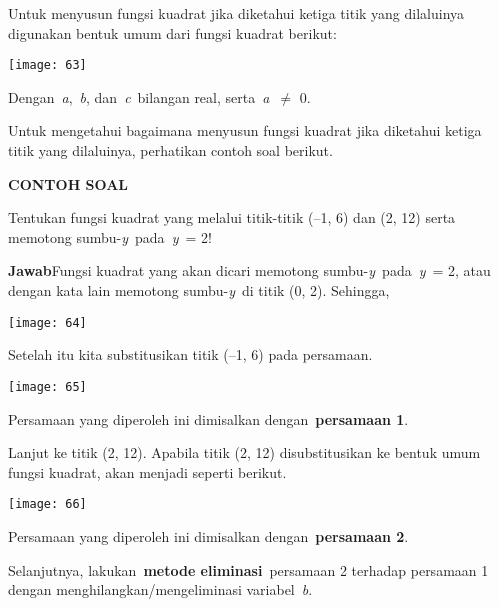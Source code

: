 \documentclass[11pt,fleqn]{book} %
\begin{document}
\noindent Untuk menyusun fungsi kuadrat jika diketahui ketiga titik yang dilaluinya digunakan bentuk umum dari fungsi kuadrat berikut:

\begin{center}
\noindent \texttt{[image: 63]}
\end{center}

\noindent Dengan~\textit{a},~\textit{b}, dan~\textit{c}~bilangan real, serta~\textit{a}~$\mathrm{\neq}$ 0.

\noindent Untuk mengetahui bagaimana menyusun fungsi kuadrat jika diketahui ketiga titik yang dilaluinya, perhatikan contoh soal berikut.

\noindent \textbf{CONTOH SOAL}

\noindent Tentukan fungsi kuadrat yang melalui titik-titik (--1, 6) dan (2, 12) serta memotong sumbu-\textit{y}~pada~\textit{y}~= 2!

\noindent \textbf{Jawab}Fungsi kuadrat yang akan dicari memotong sumbu-\textit{y}~pada~\textit{y}~= 2, atau dengan kata lain memotong sumbu-\textit{y}~di titik (0, 2). Sehingga,

\begin{center}
\noindent \texttt{[image: 64]}
\end{center}

\noindent Setelah itu kita substitusikan titik (--1, 6) pada persamaan.

\begin{center}
\noindent \texttt{[image: 65]}
\end{center}

\noindent Persamaan yang diperoleh ini dimisalkan dengan~\textbf{persamaan 1}.

\noindent Lanjut ke titik (2, 12). Apabila titik (2, 12) disubstitusikan ke bentuk umum fungsi kuadrat, akan menjadi seperti berikut.

\begin{center}
\noindent \texttt{[image: 66]}
\end{center}

\noindent Persamaan yang diperoleh ini dimisalkan dengan~\textbf{persamaan 2}.

\noindent Selanjutnya, lakukan~\textbf{metode eliminasi}~persamaan 2 terhadap persamaan 1 dengan menghilangkan/mengeliminasi variabel~\textit{b}.
\end{document}
